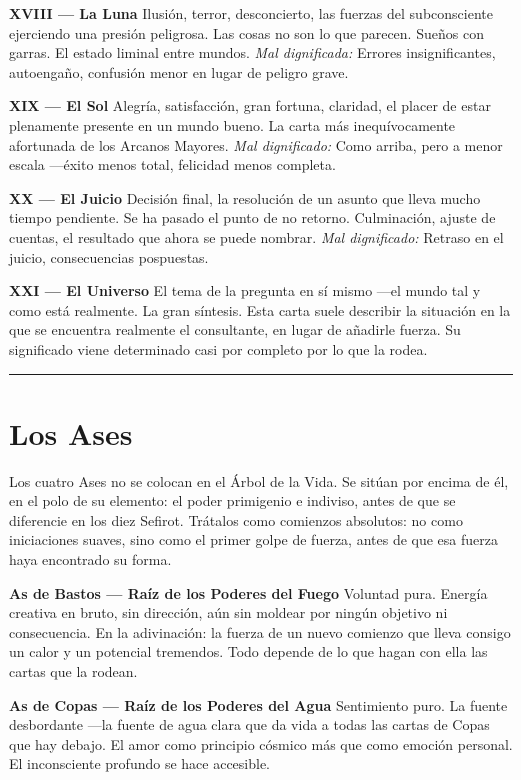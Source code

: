 \textbf{XVIII --- La Luna} Ilusión, terror, desconcierto, las fuerzas del subconsciente ejerciendo una presión peligrosa. Las cosas no son lo que parecen. Sueños con garras. El estado liminal entre mundos. \emph{Mal dignificada:} Errores insignificantes, autoengaño, confusión menor en lugar de peligro grave.

\textbf{XIX --- El Sol} Alegría, satisfacción, gran fortuna, claridad, el placer de estar plenamente presente en un mundo bueno. La carta más inequívocamente afortunada de los Arcanos Mayores. \emph{Mal dignificado:} Como arriba, pero a menor escala ---éxito menos total, felicidad menos completa.

\textbf{XX --- El Juicio} Decisión final, la resolución de un asunto que lleva mucho tiempo pendiente. Se ha pasado el punto de no retorno. Culminación, ajuste de cuentas, el resultado que ahora se puede nombrar. \emph{Mal dignificado:} Retraso en el juicio, consecuencias pospuestas.

\textbf{XXI --- El Universo} El tema de la pregunta en sí mismo ---el mundo tal y como está realmente. La gran síntesis. Esta carta suele describir la situación en la que se encuentra realmente el consultante, en lugar de añadirle fuerza. Su significado viene determinado casi por completo por lo que la rodea.

\begin{center}\rule{0.5\linewidth}{0.5pt}\end{center}

\section{Los Ases}\label{the-aces}

Los cuatro Ases no se colocan en el Árbol de la Vida. Se sitúan por encima de él, en el polo de su elemento: el poder primigenio e indiviso, antes de que se diferencie en los diez Sefirot. Trátalos como comienzos absolutos: no como iniciaciones suaves, sino como el primer golpe de fuerza, antes de que esa fuerza haya encontrado su forma.

\textbf{As de Bastos --- Raíz de los Poderes del Fuego} Voluntad pura. Energía creativa en bruto, sin dirección, aún sin moldear por ningún objetivo ni consecuencia. En la adivinación: la fuerza de un nuevo comienzo que lleva consigo un calor y un potencial tremendos. Todo depende de lo que hagan con ella las cartas que la rodean.

\textbf{As de Copas --- Raíz de los Poderes del Agua} Sentimiento puro. La fuente desbordante ---la fuente de agua clara que da vida a todas las cartas de Copas que hay debajo. El amor como principio cósmico más que como emoción personal. El inconsciente profundo se hace accesible.

